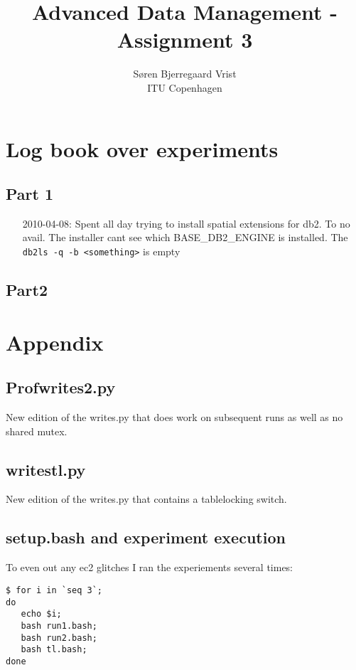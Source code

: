 
\title{Advanced Data Management - Assignment 3}
\author{S\o ren Bjerregaard Vrist\\ITU Copenhagen}


\maketitle

\chapter{Log book over experiments}

\section{Part 1}

\begin{itemize}
\item[2010-04-08:] Spent all day trying to install spatial extensions for db2.
To no avail. The installer cant see which BASE_DB2_ENGINE is installed. The
\verb|db2ls -q -b <something>| is empty
\end{itemize}

\section{Part2}

\appendix
\chapter{Appendix}
\section{Profwrites2.py}\label{app:prof}
New edition of the writes.py that does work on subsequent runs as well as no
shared mutex.


\section{writestl.py}\label{app:tl}
New edition of the writes.py that contains a tablelocking switch.


\section{setup.bash and experiment execution}\label{app:setup}
To even out any ec2 glitches I ran the experiements several times:
\begin{verbatim}
$ for i in `seq 3`; 
do 
   echo $i; 
   bash run1.bash; 
   bash run2.bash; 
   bash tl.bash; 
done
\end{verbatim}

